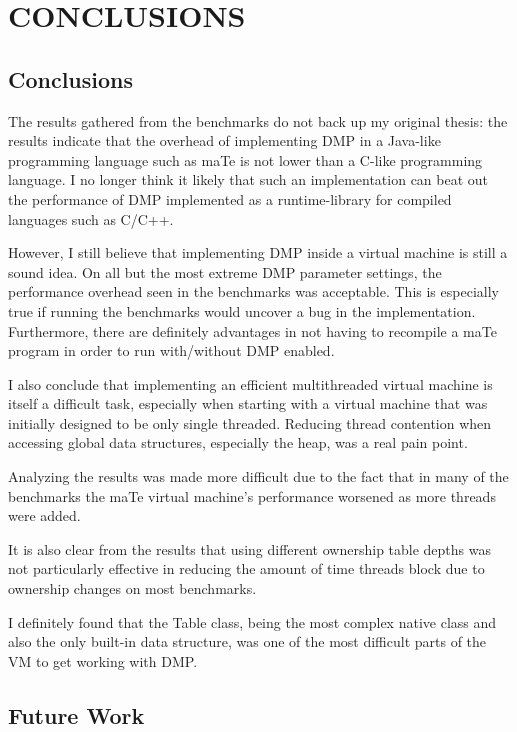 \chapter{CONCLUSIONS}
\label{CONCLUSIONS}

\section{Conclusions}

The results gathered from the benchmarks do not back up my original
thesis: the results indicate that the overhead of implementing DMP in
a Java-like programming language such as maTe is not lower than a
C-like programming language.  I no longer think it likely that such an
implementation can beat out the performance of DMP implemented as a
runtime-library for compiled languages such as C/C++.

However, I still believe that implementing DMP inside a virtual
machine is still a sound idea.  On all but the most extreme DMP
parameter settings, the performance overhead seen in the benchmarks
was acceptable.  This is especially true if running the benchmarks
would uncover a bug in the implementation.  Furthermore, there are
definitely advantages in not having to recompile a maTe program in
order to run with/without DMP enabled.

I also conclude that implementing an efficient multithreaded virtual
machine is itself a difficult task, especially when starting with a
virtual machine that was initially designed to be only single
threaded.  Reducing thread contention when accessing global data
structures, especially the heap, was a real pain point.

Analyzing the results was made more difficult due to the fact that in
many of the benchmarks the maTe virtual machine's performance worsened
as more threads were added.

It is also clear from the results that using different ownership table
depths was not particularly effective in reducing the amount of time
threads block due to ownership changes on most benchmarks.

I definitely found that the Table class, being the most complex native
class and also the only built-in data structure, was one of the most
difficult parts of the VM to get working with DMP.

\section{Future Work}

